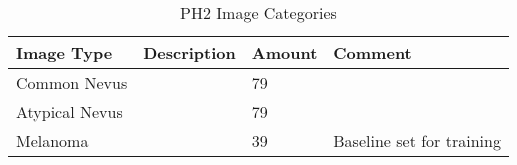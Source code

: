 \begin{table}[H]
\small
    \begin{tabular}{ | l | p{3.5cm} | l | p{3.5cm} |}
    \hline
    Image Type &  Description & Amount & Comment\\ \hline
    Common Nevus &
        & 79 &  \\ \hline
    Atypical Nevus &
        & 79 &  \\ \hline
    Melanoma &
        & 39 & Baseline set for training \\ \hline

    \end{tabular}

    \caption{PH2 Image Categories}
    \label{fig:ph2_cat}

\end{table}
